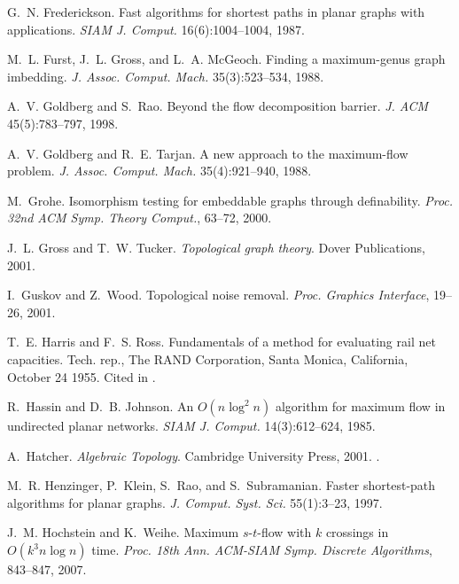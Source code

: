 \begin{thebibliography}{10}
G.~N. Frederickson.
\newblock Fast algorithms for shortest paths in planar graphs with
  applications.
\newblock \emph{SIAM J. Comput.} 16(6):1004--1004, 1987.

M.~L. Furst, J.~L. Gross, and L.~A. McGeoch.
\newblock Finding a maximum-genus graph imbedding.
\newblock \emph{J. Assoc. Comput. Mach.} 35(3):523--534, 1988.

A.~V. Goldberg and S.~Rao.
\newblock Beyond the flow decomposition barrier.
\newblock \emph{J. ACM} 45(5):783--797, 1998.

A.~V. Goldberg and R.~E. Tarjan.
\newblock A new approach to the maximum-flow problem.
\newblock \emph{J. Assoc. Comput. Mach.} 35(4):921--940, 1988.

M.~Grohe.
\newblock Isomorphism testing for embeddable graphs through definability.
\newblock \emph{Proc. 32nd ACM Symp. Theory Comput.}, 63--72, 2000.

J.~L. Gross and T.~W. Tucker.
\newblock \emph{Topological graph theory}.
\newblock Dover Publications, 2001.

I.~Guskov and Z.~Wood.
\newblock Topological noise removal.
\newblock \emph{Proc. Graphics Interface}, 19--26, 2001.

T.~E. Harris and F.~S. Ross.
\newblock Fundamentals of a method for evaluating rail net capacities.
\newblock Tech. rep., The RAND Corporation, Santa Monica, California, October
  24 1955.
\newblock Cited in \cite{s-hco-05}.

R.~Hassin and D.~B. Johnson.
\newblock An {$O(n\log^2 n)$} algorithm for maximum flow in undirected planar
  networks.
\newblock \emph{SIAM J. Comput.} 14(3):612--624, 1985.

A.~Hatcher.
\newblock \emph{Algebraic Topology}.
\newblock Cambridge University Press, 2001.
\newblock {}.

M.~R. Henzinger, P.~Klein, S.~Rao, and S.~Subramanian.
\newblock Faster shortest-path algorithms for planar graphs.
\newblock \emph{J. Comput. Syst. Sci.} 55(1):3--23, 1997.

J.~M. Hochstein and K.~Weihe.
\newblock Maximum $s$-$t$-flow with $k$ crossings in {$O(k^3n\log n)$} time.
\newblock \emph{Proc. 18th Ann. ACM-SIAM Symp. Discrete Algorithms}, 843--847,
  2007.


\end{thebibliography}
